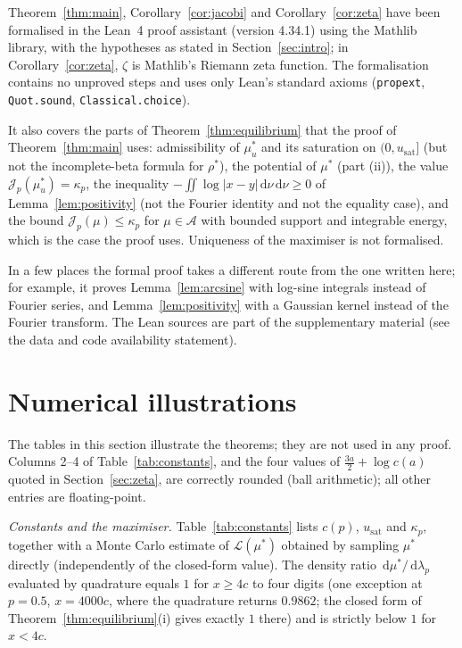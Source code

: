 \documentclass{amsart}
\theoremstyle{definition}
\theoremstyle{remark}
\numberwithin{equation}{section}
\newcommand{\cA}{\mathcal{A}}
\newcommand{\cJ}{\mathcal{J}}
\newcommand{\cL}{\mathcal{L}}
\newcommand{\dd}{\,\mathrm{d}}
\newcommand{\usat}{u_{\mathrm{sat}}}
\begin{document}
Theorem~\ref{thm:main}, Corollary~\ref{cor:jacobi} and Corollary~\ref{cor:zeta} have been formalised in the Lean~4
proof assistant (version 4.34.1) using the Mathlib library, with the hypotheses as stated in Section~\ref{sec:intro}; in
Corollary~\ref{cor:zeta}, $\zeta$ is Mathlib's Riemann zeta function. The formalisation contains no unproved steps and
uses only Lean's standard axioms (\texttt{propext}, \texttt{Quot.sound}, \texttt{Classical.choice}).

It also covers the parts of Theorem~\ref{thm:equilibrium} that the proof of Theorem~\ref{thm:main} uses: admissibility
of $\mu^*_u$ and its saturation on $(0,\usat]$ (but not the incomplete-beta formula for $\rho^*$), the potential of
$\mu^*$ (part (ii)), the value $\cJ_p(\mu^*_u)=\kappa_p$, the inequality $-\iint\log|x-y|\dd\nu\dd\nu\ge0$ of
Lemma~\ref{lem:positivity} (not the Fourier identity and not the equality case), and the bound
$\cJ_p(\mu)\le\kappa_p$ for $\mu\in\cA$ with bounded support and integrable energy, which is the case the proof uses.
Uniqueness of the maximiser is not formalised.

In a few places the formal proof takes a different route from the one written here; for example, it proves
Lemma~\ref{lem:arcsine} with log-sine integrals instead of Fourier series, and Lemma~\ref{lem:positivity} with a
Gaussian kernel instead of the Fourier transform. The Lean sources are part of the supplementary material (see the
data and code availability statement).

\section{Numerical illustrations}\label{sec:numerics}

The tables in this section illustrate the theorems; they are not used in any proof. Columns 2--4 of
Table~\ref{tab:constants}, and the four values of $\frac{3a}{2}+\log c(a)$ quoted in Section~\ref{sec:zeta}, are
correctly rounded (ball arithmetic); all other entries are floating-point.

\emph{Constants and the maximiser.} Table~\ref{tab:constants} lists $c(p)$, $\usat$ and $\kappa_p$, together with a
Monte Carlo estimate of $\cL(\mu^*)$ obtained by sampling $\mu^*$ directly (independently of the closed-form value).
The density ratio $\dd\mu^*/\dd\lambda_p$ evaluated by quadrature equals $1$ for $x\ge4c$ to four digits (one
exception at $p=0.5$, $x=4000c$, where the quadrature returns $0.9862$; the closed form of
Theorem~\ref{thm:equilibrium}(i) gives exactly $1$ there) and is strictly below $1$ for $x<4c$.
\end{document}
